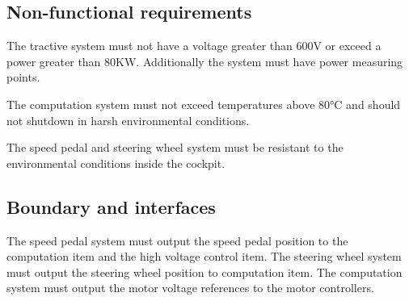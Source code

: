 \subsection{Non-functional requirements}
%
%
%
The tractive system must not have a voltage greater than 600V or exceed a power greater than 80KW.
Additionally the system must have power measuring points.

The computation system must not exceed temperatures above 80°C and should not shutdown in harsh environmental conditions.

The speed pedal and steering wheel system must be resistant to the environmental conditions inside the cockpit.


\subsection{Boundary and interfaces}
%
%

The speed pedal system must output the speed pedal position to the computation item and the high voltage control item.
The steering wheel system must output the steering wheel position to computation item.
The computation system must output the motor voltage references to the motor controllers.


